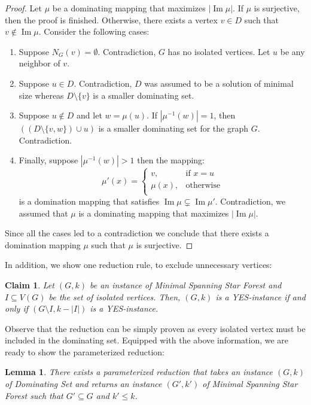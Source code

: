 \documentclass[en]{pracamgr}
\newtheorem{lemma}{Lemma}
\newtheorem{claim}{Claim}
\theoremstyle{definition}
\newcommand{\mssfp}{{\sc Minimal Spanning Star Forest}}
\newcommand{\domsetp}{{\sc Dominating Set}}
\DeclareMathOperator{\Ima}{Im}
\begin{document}
\begin{proof}
	Let $\mu$ be a dominating mapping that maximizes $|\Ima \mu|$. If $\mu$ is surjective, then the proof is finished. Otherwise, there exists a vertex $v \in D$ such that $v \notin \Ima \mu$. Consider the following cases:
	\begin{enumerate}
		\item Suppose $N_G(v) = \emptyset$. Contradiction, $G$ has no isolated vertices. Let $u$ be any neighbor of $v$.
		\item Suppose $u \in D$. Contradiction, $D$ was assumed to be a solution of minimal size whereas $D \setminus \{v\}$ is a smaller dominating set.
		\item Suppose $u \notin D$ and let $w = \mu(u)$. If $|\mu^{-1}(w)|=1$, then $((D \setminus \{v,w\}) \cup u)$ is a smaller dominating set for the graph $G$. Contradiction.
		\item Finally, suppose $|\mu^{-1}(w)| > 1$ then the mapping:
		\begin{equation*}
			\mu'(x) = \begin{cases}
			v, & \text{if }x = u \\
			\mu(x), &\text{otherwise} \\
			\end{cases}
		\end{equation*}
		is a domination mapping that satisfies $\Ima \mu \subsetneq \Ima \mu'$. Contradiction, we assumed that $\mu$ is a dominating mapping that maximizes $|\Ima \mu|$.
	\end{enumerate}
	
	Since all the cases led to a contradiction we conclude that there exists a domination mapping $\mu$ such that $\mu$ is surjective.  
\end{proof}

In addition, we show one reduction rule, to exclude unnecessary vertices:

\begin{claim}\label{dom-set-rr}
	Let $(G,k)$ be an instance of \mssfp{} and $I \subseteq V(G)$ be the set of isolated vertices. Then, $(G,k)$ is a YES-instance if and only if $(G \setminus I, k-|I|)$ is a YES-instance.
\end{claim}

Observe that the reduction can be simply proven as every isolated vertex must be included in the dominating set. Equipped with the above information, we are ready to show the parameterized reduction:

\begin{lemma}\label{dom-ssf reduction}
	There exists a parameterized reduction that takes an instance $(G,k)$ of \domsetp{} and returns an instance $(G',k')$ of \mssfp{} such that $G' \subseteq G$ and $k' \leq k$. 
\end{lemma}
\end{document}
